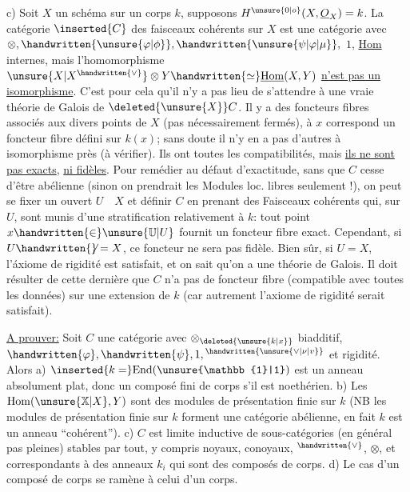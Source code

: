 c) Soit $X$ un schéma  sur un corps $k$, supposons $H^{\unsure{0|o}}(X,\underline{O}_{X})=k$. La catégorie $\inserted{C}$ des faisceaux cohérents sur $X$ est une catégorie avec $\otimes,\handwritten{\unsure{\varphi|\phi}},\handwritten{\unsure{\psi|\varphi|\mu}},$  $1$, \uline{Hom} internes,  mais l'homomorphisme $\unsure{X|X^{\handwritten{\vee}}}\otimes Y\handwritten{\simeq}\underline{\mathrm{Hom}}(X,Y)$ \uline{n'est pas un isomorphisme}. C'est pour cela qu'il n'y a pas lieu de s'attendre à une vraie théorie de Galois de $\deleted{\unsure{X}}C$. Il y a des foncteurs fibres associés aux divers points de $X$ (pas nécessairement fermés), à $x$ correspond un foncteur fibre défini sur $k(x)$; sans doute il n'y en a pas d'autres à isomorphisme près (à vérifier). Ils ont toutes les compatibilités, mais \uline{ils ne sont pas exacts},  \uline{ni fidèles}. Pour remédier au défaut d'exactitude, sans que $C$ cesse d'être abélienne (sinon on prendrait les Modules loc. libres seulement !), on peut se fixer un ouvert $U\quad X$ et définir $C$ en prenant des Faisceaux cohérents qui, sur $U$, sont munis d'une stratification relativement à $k$: tout point $x\handwritten{\in}\unsure{\mathbb{U}|U}$ fournit un foncteur fibre exact. Cependant, si $U\handwritten{\not}=X$, ce foncteur ne sera pas fidèle. Bien sûr, si $U=X$, l'áxiome de rigidité est satisfait, et on sait qu'on a une théorie de Galois. Il doit résulter de cette dernière que $C$ n'a pas de foncteur fibre (compatible avec toutes les données) sur une extension de $k$ (car autrement l'axiome de rigidité serait satisfait).

\uline{A prouver:} Soit $C$ une catégorie  avec $\otimes_{\deleted{\unsure{k|x}}}$ biadditif, $\handwritten{\varphi},\handwritten{\psi},1,{}^{\handwritten{\unsure{\vee|\nu|v}}}$ et rigidité. Alors a) $\inserted{k=}\mathrm{End}(\unsure{\mathbb{1}|1})$ est un anneau absolument plat, donc un composé fini de  corps s'il est noethérien. b) Les $\mathrm{Hom}(\unsure{\mathbb{X}|X},Y)$ sont des modules de présentation finie  sur $k$ (NB les modules de présentation finie sur $k$ forment une catégorie abélienne, en fait $k$ est un anneau ``cohérent''). c)  $C$ est limite inductive de sous-catégories (en général pas pleines) stables par tout, y compris noyaux, conoyaux, ${}^{\handwritten{\vee}}$, $\otimes$, et correspondants à des anneaux $k_{i}$ qui sont des  composés de corps. d) Le cas d'un composé de corps se ramène à celui d'un corps.


